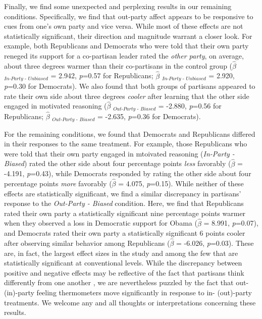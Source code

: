 \documentclass[12pt, letterpaper]{article}
\begin{document}
{Finally, we find some unexpected and perplexing results in our remaining conditions. Specifically, we find that out-party affect appears to be responsive to cues from one's own party and vice versa. While most of these effects are not statistically significant, their direction and magnitude warrant a closer look. For example, both Republicans and Democrats who were told that their own party reneged its support for a co-partisan leader rated the \textit{other party}, on average, about three degrees warmer than their co-partisans in the control group ($\hat{\beta}$ $_{\textit{In-Party - Unbiased}}$ = 2.942, \textit{p}=0.57 for Republicans; $\hat{\beta}$ $_{\textit{In-Party - Unbiased}}$ = 2.920, \textit{p}=0.30 for Democrats). We also found that both groups of partisans appeared to rate their own side about three degrees \textit{cooler} after learning that the other side engaged in motivated reasoning ($\hat{\beta}$ $_{\textit{Out-Party - Biased}}$ = -2.880, \textit{p}=0.56 for Republicans; $\hat{\beta}$ $_{\textit{Out-Party - Biased}}$ = -2.635, \textit{p}=0.36 for Democrats). 

For the remaining conditions, we found that Democrats and Republicans differed in their responses to the same treatment. For example, those Republicans who were told that their own party engaged in mtoivated reasoning  (\textit{In-Party - Biased}) rated the other side about four percentage points \textit{less} favorably ($\hat{\beta}$ = -4.191, \textit{p}=0.43), while Democrats responded by rating the other side about four percentage points \textit{more} favorably ($\hat{\beta}$ = 4.075, \textit{p}=0.15). While neither of these effects are statistically significant, we find a similar discrepancy in partisans' response to the \textit{Out-Party - Biased} condition. Here, we find that Republicans rated their own party a statistically significant nine percentage points warmer when they observed a loss in Democratic support for Obama ($\hat{\beta}$ = 8.991, \textit{p}=0.07), and Democrats rated their own party a statistically significant 6 points cooler after observing similar behavior among Republicans ($\hat{\beta}$ = -6.026, \textit{p}=0.03). These are, in fact, the largest effect sizes in the study and among the few that are statistically significant at conventional levels. While the discrepancy between positive and negative effects may be reflective of the fact that partisans think differently from one another \citep{grossmanhopkins_2016}, we are nevertheless puzzled by the fact that out- (in)-party feeling thermometers move significantly in response to in- (out)-party treatments. We welcome any and all thoughts or interpretations concerning these results. 

}
\end{document}
